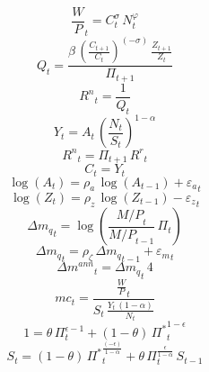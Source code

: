 \begin{dmath}
{{\frac{W}{P}}}_{t}={{C}}_{t}^{{{\sigma}}}\, {{N}}_{t}^{{{\varphi}}}
\end{dmath}
\begin{dmath}
{{Q}}_{t}=\frac{{{\beta}}\, \left(\frac{{{C}}_{t+1}}{{{C}}_{t}}\right)^{\left(-{{\sigma}}\right)}\, \frac{{{Z}}_{t+1}}{{{Z}}_{t}}}{{{\Pi}}_{t+1}}
\end{dmath}
\begin{dmath}
{{R^n}}_{t}=\frac{1}{{{Q}}_{t}}
\end{dmath}
\begin{dmath}
{{Y}}_{t}={{A}}_{t}\, \left(\frac{{{N}}_{t}}{{{S}}_{t}}\right)^{1-{{\alpha}}}
\end{dmath}
\begin{dmath}
{{R^n}}_{t}={{\Pi}}_{t+1}\, {{R^{r}}}_{t}
\end{dmath}
\begin{dmath}
{{C}}_{t}={{Y}}_{t}
\end{dmath}
\begin{dmath}
\log\left({{A}}_{t}\right)={{\rho_a}}\, \log\left({{A}}_{t-1}\right)+{{\varepsilon_a}}_{t}
\end{dmath}
\begin{dmath}
\log\left({{Z}}_{t}\right)={{\rho_{z}}}\, \log\left({{Z}}_{t-1}\right)-{{\varepsilon_z}}_{t}
\end{dmath}
\begin{dmath}
{{\Delta m_q}}_{t}=\log\left(\frac{{{M/P}}_{t}}{{{M/P}}_{t-1}}\, {{\Pi}}_{t}\right)
\end{dmath}
\begin{dmath}
{{\Delta m_q}}_{t}={{\rho_{\zeta}}}\, {{\Delta m_q}}_{t-1}+{{\varepsilon_m}}_{t}
\end{dmath}
\begin{dmath}
{{\Delta m^{ann}}}_{t}={{\Delta m_q}}_{t}\, 4
\end{dmath}
\begin{dmath}
{{mc}}_{t}=\frac{{{\frac{W}{P}}}_{t}}{{{S}}_{t}\, \frac{{{Y}}_{t}\, \left(1-{{\alpha}}\right)}{{{N}}_{t}}}
\end{dmath}
\begin{dmath}
1={{\theta}}\, {{\Pi}}_{t}^{{{\epsilon}}-1}+\left(1-{{\theta}}\right)\, {{\Pi^*}}_{t}^{1-{{\epsilon}}}
\end{dmath}
\begin{dmath}
{{S}}_{t}=\left(1-{{\theta}}\right)\, {{\Pi^*}}_{t}^{\frac{\left(-{{\epsilon}}\right)}{1-{{\alpha}}}}+{{\theta}}\, {{\Pi}}_{t}^{\frac{{{\epsilon}}}{1-{{\alpha}}}}\, {{S}}_{t-1}
\end{dmath}

